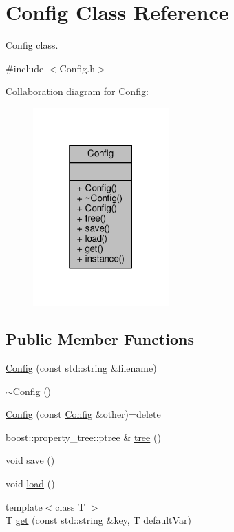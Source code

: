 \hypertarget{class_config}{\section{Config Class Reference}
\label{class_config}
}


\hyperlink{class_config}{Config} class.  




{\ttfamily \#include $<$Config.\-h$>$}



Collaboration diagram for Config\-:
\nopagebreak
\begin{figure}[H]
\begin{center}
\leavevmode
\includegraphics[width=148pt]{class_config__coll__graph}
\end{center}
\end{figure}
\subsection*{Public Member Functions}
\begin{DoxyCompactItemize}
\item 
\hyperlink{class_config_abc51a2c710c8666d27b53cc03597201d}{Config} (const std\-::string \&filename)
\item 
\hyperlink{class_config_a543dce59b66475c5108088ee4ce1cdfc}{$\sim$\-Config} ()
\item 
\hyperlink{class_config_aea1b7e862074892ee39a5583c342c482}{Config} (const \hyperlink{class_config}{Config} \&other)=delete
\item 
boost\-::property\-\_\-tree\-::ptree \& \hyperlink{class_config_a006701bd126aa5809b3a15e75c63bfb6}{tree} ()
\item 
void \hyperlink{class_config_ae7e68962f22a2c965a61702de1c637db}{save} ()
\item 
void \hyperlink{class_config_add4ebd0c89505c9b5368f03264555606}{load} ()
\item 
{\footnotesize template$<$class T $>$ }\\T \hyperlink{class_config_a1f8e429f853f20cac7cf128f2b71543e}{get} (const std\-::string \&key, T default\-Var)
\end{DoxyCompactItemize}
